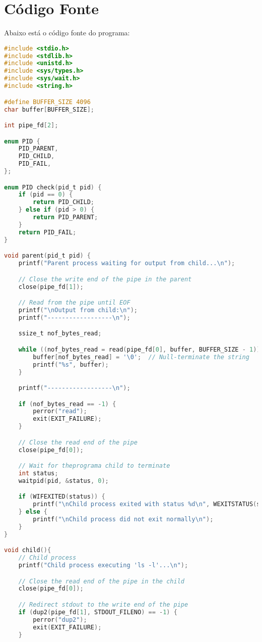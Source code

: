 \documentclass[12pt]{article}
\begin{document}
\section{Código Fonte}

Abaixo está o código fonte do programa:

\begin{lstlisting}[language=C]
#include <stdio.h>
#include <stdlib.h>
#include <unistd.h>
#include <sys/types.h>
#include <sys/wait.h>
#include <string.h>

#define BUFFER_SIZE 4096
char buffer[BUFFER_SIZE];

int pipe_fd[2];

enum PID {
    PID_PARENT,
    PID_CHILD,
    PID_FAIL,
};

enum PID check(pid_t pid) {
    if (pid == 0) {
        return PID_CHILD;
    } else if (pid > 0) {
        return PID_PARENT;
    }
    return PID_FAIL;
}

void parent(pid_t pid) {
    printf("Parent process waiting for output from child...\n");

    // Close the write end of the pipe in the parent
    close(pipe_fd[1]);

    // Read from the pipe until EOF
    printf("\nOutput from child:\n");
    printf("------------------\n");

    ssize_t nof_bytes_read;

    while ((nof_bytes_read = read(pipe_fd[0], buffer, BUFFER_SIZE - 1)) > 0) {
        buffer[nof_bytes_read] = '\0';  // Null-terminate the string
        printf("%s", buffer);
    }

    printf("------------------\n");

    if (nof_bytes_read == -1) {
        perror("read");
        exit(EXIT_FAILURE);
    }

    // Close the read end of the pipe
    close(pipe_fd[0]);

    // Wait for theprograma child to terminate
    int status;
    waitpid(pid, &status, 0);

    if (WIFEXITED(status)) {
        printf("\nChild process exited with status %d\n", WEXITSTATUS(status));
    } else {
        printf("\nChild process did not exit normally\n");
    }
}

void child(){
    // Child process
    printf("Child process executing 'ls -l'...\n");

    // Close the read end of the pipe in the child
    close(pipe_fd[0]);

    // Redirect stdout to the write end of the pipe
    if (dup2(pipe_fd[1], STDOUT_FILENO) == -1) {
        perror("dup2");
        exit(EXIT_FAILURE);
    }


\end{lstlisting}
\end{document}
